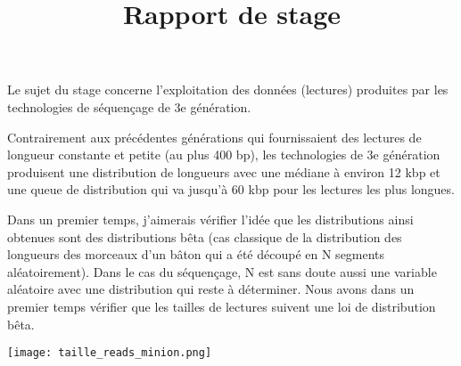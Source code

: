 \documentclass[12pt]{article}
\begin{document}
\title{Rapport de stage}
\maketitle


Le  sujet du stage concerne l'exploitation des données (lectures)
produites par les technologies de séquençage de 3e génération.

Contrairement aux précédentes générations qui fournissaient des lectures
de longueur constante et petite (au plus 400 bp), les technologies de 3e
génération produisent une distribution de longueurs avec une médiane à
environ 12 kbp et une queue de distribution qui va jusqu'à 60 kbp pour les
lectures les plus longues.

Dans un premier temps, j'aimerais vérifier l'idée que les distributions ainsi obtenues sont des distributions bêta (cas classique de la distribution
des longueurs des morceaux d'un bâton qui a été découpé en N segments
aléatoirement). Dans le cas du séquençage, N est sans doute aussi une
variable aléatoire avec une distribution qui reste à déterminer.
Nous avons dans un premier temps vérifier que les tailles de lectures suivent une loi de distribution bêta.

\texttt{[image: taille\_reads\_minion.png]} 
\end{document}
